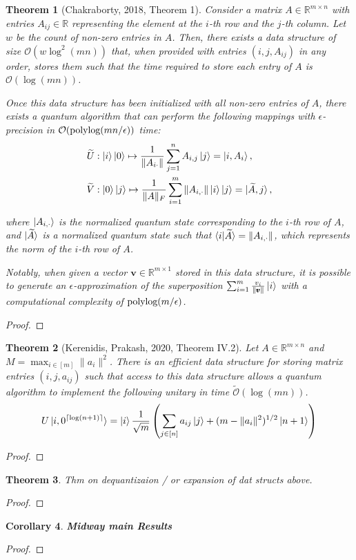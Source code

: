 \documentclass[10pt,twoside,reqno]{amsart} %
\theoremstyle{plain}
\newtheorem{thm}{Theorem}[section]
\newtheorem{cor}[thm]{Corollary}
\theoremstyle{definition}
\begin{document}
\begin{thm}[Chakraborty, 2018, Theorem 1]
  Consider a matrix $A \in \mathbb{R}^{m \times n}$ with entries $A_{ij} \in
  \mathbb{R}$ representing the element at the $i$-th row and the $j$-th column.
  Let $w$ be the count of non-zero entries in $A$. Then, there exists a data
  structure of size $\mathcal{O}(w \log^2(mn))$ that, when provided with entries
  $(i, j, A_{ij})$ in any order, stores them such that the time required to store
  each entry of $A$ is $\mathcal{O}(\log(mn))$.

  Once this data structure has been initialized with all non-zero entries of $A$,
  there exists a quantum algorithm that can perform the following mappings with
  $\epsilon$-precision in $\mathcal{O}(\textrm{\normalfont 
  polylog}(mn/\epsilon))$ time:
  \begin{align*}
    \widetilde{U} & : \ket{i}\ket{0} \mapsto \frac{1}{\|A_{i \cdot}\|}
    \sum_{j=1}^n A_{i,j}\ket{j} = \ket{i, A_i}, \\
    \widetilde{V} & : \ket{0}\ket{j} \mapsto \frac{1}{\|A\|_F}
    \sum_{i=1}^m\|A_{i,\cdot}\|\ket{i}\ket{j} = \ket{\widetilde{A}, j},
  \end{align*}

  where $\ket{A_{i,\cdot}}$ is the normalized quantum state corresponding to
  the $i$-th row of $A$, and $\ket{\widetilde{A}}$ is a normalized quantum state
  such that $\braket{i|\widetilde{A}} = \|A_{i,\cdot}\|$, which represents the
  norm of the $i$-th row of $A$.

  Notably, when given a vector $\pmb{v} \in \mathbb{R}^{m \times 1}$ stored in
  this data structure, it is possible to generate an $\epsilon$-approximation of
  the superposition $\sum_{i=1}^m \frac{v_i}{\|\pmb{v}\|}\ket{i}$ with a
  computational complexity of $\textrm{\normalfont polylog}(m/\epsilon)$.
\end{thm}
\begin{proof}
\end{proof}
\begin{thm}[Kerenidis, Prakash, 2020, Theorem IV.2]
  Let $A\in\mathbb{R}^{m\times n}$ and $M=\max_{i\in[m]}\|a_i\|^2$. There is an
  efficient data structure for storing matrix entries $(i,j,a_{ij})$ such that
  access to this data structure allows a quantum algorithm to implement the
  following unitary in time $\widetilde{\mathcal{O}}(\log(mn))$.
  \[
    U\ket{i,0^{\lceil\log(n+1)\rceil}}=\ket{i}\frac{1}{\sqrt{m}}
    \left(\sum_{j\in[n]}a_{ij}\ket{j}+(m-\|a_i\|^2)^{1/2}\ket{n+1}\right)
  \]
\end{thm}
\begin{proof}
\end{proof}
\begin{thm}
  Thm on dequantizaion / or expansion of dat structs above.
\end{thm}
\begin{proof}
\end{proof}
\begin{cor}
  \textbf{Midway main Results}
\end{cor}
\begin{proof}
\end{proof}
\end{document}
